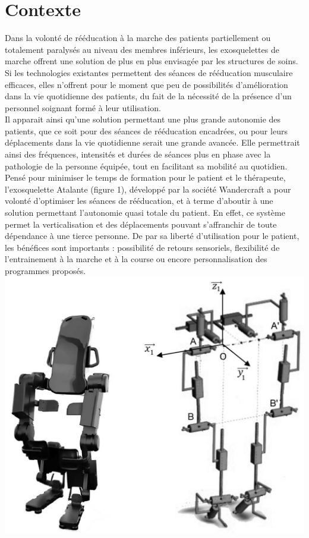\documentclass[10pt]{article}
\begin{document}
\section*{Contexte}
Dans la volonté de rééducation à la marche des patients partiellement ou totalement paralysés au niveau des membres inférieurs, les exosquelettes de marche offrent une solution de plus en plus envisagée par les structures de soins. Si les technologies existantes permettent des séances de rééducation musculaire efficaces, elles n'offrent pour le moment que peu de possibilités d'amélioration dans la vie quotidienne des patients, du fait de la nécessité de la présence d'un personnel soignant formé à leur utilisation.\\
Il apparait ainsi qu'une solution permettant une plus grande autonomie des patients, que ce soit pour des séances de rééducation encadrées, ou pour leurs déplacements dans la vie quotidienne serait une grande avancée. Elle permettrait ainsi des fréquences, intensités et durées de séances plus en phase avec la pathologie de la personne équipée, tout en facilitant sa mobilité au quotidien.\\
Pensé pour minimiser le temps de formation pour le patient et le thérapeute, l'exosquelette Atalante (figure 1), développé par la société Wandercraft a pour volonté d'optimiser les séances de rééducation, et à terme d'aboutir à une solution permettant l'autonomie quasi totale du patient. En effet, ce système permet la verticalisation et des déplacements pouvant s'affranchir de toute dépendance à une tierce personne. De par sa liberté d'utilisation pour le patient, les bénéfices sont importants : possibilité de retours sensoriels, flexibilité de l'entrainement à la marche et à la course ou encore personnalisation des programmes proposés.\\
\includegraphics[max width=\textwidth, center]{2025_07_03_97545f5dc188959e5663g-01}
\end{document}
